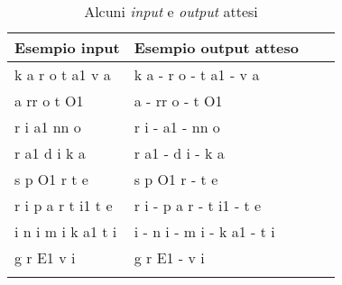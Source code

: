 \begin{center}
        \bgroup
        \def\arraystretch{1.8}
        \begin{longtable}{ | l | p{2cm} | p{4.7cm} | p{2.5cm} |}
        \hline
        \textbf{Esempio input} & \textbf{Esempio output atteso} \\ \hline
        k a r o t a1 v a & k a - r o - t a1 - v a  \newline  \\ \hline
        a rr o t O1 & a - rr o - t O1 \newline  \\ \hline
        r i a1 nn o & r i - a1 - nn o \newline  \\ \hline
        r a1 d i k a & r a1 - d i - k a     \newline  \\ \hline
        s p O1 r t e & s p O1 r - t e   \newline  \\ \hline
        r i p a r t i1 t e &  r i - p a r - t i1 - t e   \newline  \\ \hline
        i n i m i k a1 t i & i - n i - m i - k a1 - t i   \newline  \\ \hline
        g r E1 v i & g r E1 - v i     \newline  \\ \hline
        \caption{Alcuni \textit{input} e \textit{output} attesi}
        \end{longtable}
        \egroup
     \end{center}
